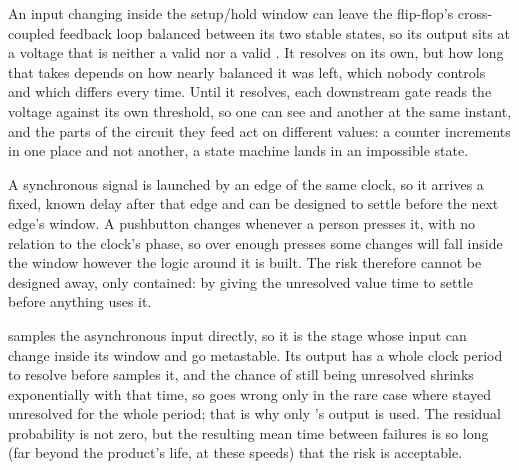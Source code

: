 

An input changing inside the setup/hold window can leave the flip-flop's cross-coupled feedback
loop balanced between its two stable states, so its output sits at a voltage that is neither a
valid  nor a valid . It resolves on its own, but how long that takes depends on how
nearly balanced it was left, which nobody controls and which differs every time. Until it resolves,
each downstream gate reads the voltage against its own threshold, so one can see  and
another  at the same instant, and the parts of the circuit they feed act on different
values: a counter increments in one place and not another, a state machine lands in an impossible
state.

A synchronous signal is launched by an edge of the same clock, so it arrives a fixed, known delay
after that edge and can be designed to settle before the next edge's window. A pushbutton changes
whenever a person presses it, with no relation to the clock's phase, so over enough presses some
changes will fall inside the window however the logic around it is built. The risk therefore cannot
be designed away, only contained: by giving the unresolved value time to settle before anything
uses it.

 samples the asynchronous input directly, so it is the stage whose input can change inside
its window and go metastable. Its output has a whole clock period to resolve before 
samples it, and the chance of still being unresolved shrinks exponentially with that time, so
 goes wrong only in the rare case where  stayed unresolved for the whole period;
that is why only 's output is used. The residual probability is not zero, but the
resulting mean time between failures is so long (far beyond the product's life, at these speeds)
that the risk is acceptable.

